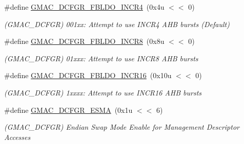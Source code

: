 \begin{DoxyCompactItemize}
\mbox{\label{group__SAMV71__GMAC_ga4d72e5ffe0ae8177ce94e06f1bdf7f7e}} 
\#define \mbox{\hyperlink{group__SAMV71__GMAC_ga4d72e5ffe0ae8177ce94e06f1bdf7f7e}{G\+M\+A\+C\+\_\+\+D\+C\+F\+G\+R\+\_\+\+F\+B\+L\+D\+O\+\_\+\+I\+N\+C\+R4}}~(0x4u $<$$<$ 0)
\begin{DoxyCompactList}\small\item\em (G\+M\+A\+C\+\_\+\+D\+C\+F\+GR) 001xx\+: Attempt to use I\+N\+C\+R4 A\+HB bursts (Default) \end{DoxyCompactList}\item 
\mbox{\label{group__SAMV71__GMAC_ga76aca0328bdde04f45ea18aaed5dbc9c}} 
\#define \mbox{\hyperlink{group__SAMV71__GMAC_ga76aca0328bdde04f45ea18aaed5dbc9c}{G\+M\+A\+C\+\_\+\+D\+C\+F\+G\+R\+\_\+\+F\+B\+L\+D\+O\+\_\+\+I\+N\+C\+R8}}~(0x8u $<$$<$ 0)
\begin{DoxyCompactList}\small\item\em (G\+M\+A\+C\+\_\+\+D\+C\+F\+GR) 01xxx\+: Attempt to use I\+N\+C\+R8 A\+HB bursts \end{DoxyCompactList}\item 
\mbox{\label{group__SAMV71__GMAC_ga7b4abe40b1704d8b097072c9fffc2363}} 
\#define \mbox{\hyperlink{group__SAMV71__GMAC_ga7b4abe40b1704d8b097072c9fffc2363}{G\+M\+A\+C\+\_\+\+D\+C\+F\+G\+R\+\_\+\+F\+B\+L\+D\+O\+\_\+\+I\+N\+C\+R16}}~(0x10u $<$$<$ 0)
\begin{DoxyCompactList}\small\item\em (G\+M\+A\+C\+\_\+\+D\+C\+F\+GR) 1xxxx\+: Attempt to use I\+N\+C\+R16 A\+HB bursts \end{DoxyCompactList}\item 
\mbox{\label{group__SAMV71__GMAC_gac6317ea33414d67f44f1d86ab1a72419}} 
\#define \mbox{\hyperlink{group__SAMV71__GMAC_gac6317ea33414d67f44f1d86ab1a72419}{G\+M\+A\+C\+\_\+\+D\+C\+F\+G\+R\+\_\+\+E\+S\+MA}}~(0x1u $<$$<$ 6)
\begin{DoxyCompactList}\small\item\em (G\+M\+A\+C\+\_\+\+D\+C\+F\+GR) Endian Swap Mode Enable for Management Descriptor Accesses \end{DoxyCompactList}\item 
\mbox{\label{group__SAMV71__GMAC_ga27eb39d9c03abd7ee291fe0a2a4cf9d7}} 

\end{DoxyCompactItemize}
